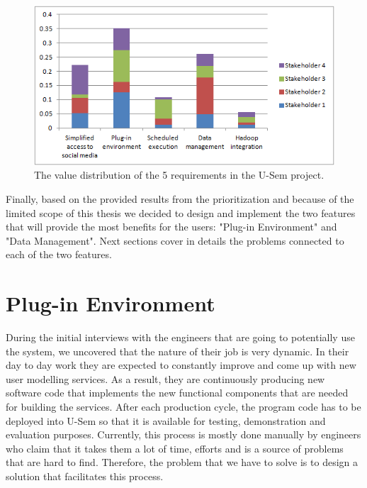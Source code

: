 \begin{figure}[h!]
  \centering
      \includegraphics{requirements/value_diagram.png}
  \caption{The value distribution of the 5 requirements in the U-Sem project.}
  \label{fig:reqPriority}
\end{figure}


Finally, based on the provided results from the prioritization and because of the limited scope of this thesis we decided to design and implement the two features that will provide the most benefits for the users: "Plug-in Environment" and "Data Management". Next sections cover in details the problems connected to each of the two features.

\section{Plug-in Environment}
\label{sec:problemDefPlugin}

During the initial interviews with the engineers that are going to potentially use the system, we uncovered that the nature of their job is very dynamic. In their day to day work they are expected to constantly improve and come up with new user modelling services. As a result, they are continuously producing new software code that implements the new functional components that are needed for building the services. After each production cycle, the program code has to be deployed into U-Sem so that it is available for testing, demonstration and evaluation purposes. Currently, this process is mostly done manually by engineers who claim that it takes them a lot of time, efforts and is a source of problems that are hard to find. Therefore, the problem that we have to solve is to design a solution that facilitates this process. 

